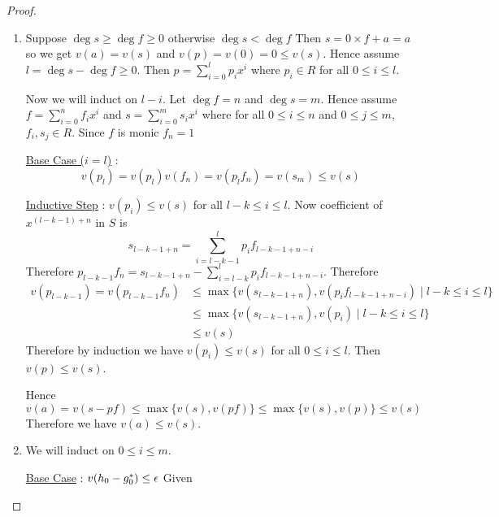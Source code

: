 \begin{proof}
	\begin{enumerate}[label=(\roman*)]
		\item \parinn Suppose $\deg s \geq\deg f \geq 0$ otherwise $\deg s< \deg f$ Then $s= 0\times f + a=a$ so we get $v(a)=v(s)$ and $v(p)=v(0)=0\leq v(s)$. Hence assume $l=\deg s-\deg f\geq 0$. Then $p=\sum\limits_{i=0}^l p_ix^i$ where $p_i\in R$ for all $0\leq i\leq l$.
		
		Now we will induct on $l-i$. Let $\deg f=n$ and $\deg s=m$. Hence assume $f=\sum\limits_{i=0}^n f_ix^i$ and $s=\sum\limits_{i=0}^m s_ix^i$ where for all $0\leq i\leq n$ and $0\leq j\leq m$, $f_i,s_j\in R$. Since $f$ is monic $f_n=1$
		
		\underline{Base Case ($i=l$)} : $$v(p_l)= v(p_l)v(f_n)= v(p_lf_n)=v(s_m)\leq v(s)$$ 
		
		\underline{Inductive Step} : $v(p_i)\leq v(s)$ for all $l-k\leq i\leq l$. Now coefficient of $x^{(l-k-1)+n}$ in $S$ is $$s_{l-k-1+n}=\sum\limits_{i=l-k-1}^{l}p_if_{l-k-1+n-i}$$Therefore $p_{l-k-1}f_n=s_{l-k-1+n}-\sum\limits_{i=l-k}^l p_if_{l-k-1+n-i}$. Therefore 
		\begin{align*}
			v(p_{l-k-1})=v(p_{l-k-1}f_n) & \leq \max\{  v(s_{l-k-1+n}), v(p_if_{l-k-1+n-i})\mid l-k\leq i\leq l  \} \\
			                             & \leq \max\{v(s_{l-k-1+n}), v(p_i)\mid l-k\leq i\leq l\}                  \\
			                             & \leq v(s)
		\end{align*}
		Therefore by induction we have $v(p_i)\leq v(s)$ for all $0\leq i\leq l$. Then $v(p)\leq v(s)$.
		
		Hence $$v(a)=v(s-pf)\leq \max\{v(s),v(pf)\}\leq \max\{v(s),v(p)\}\leq v(s)$$Therefore we have $v(a)\leq v(s)$.
		\item \parinn We will induct on $0\leq i\leq m$. 
		
		\underline{Base Case} : $v(h_0-g_0^*)\leq \epsilon$ Given
		

\end{enumerate}
\end{proof}
